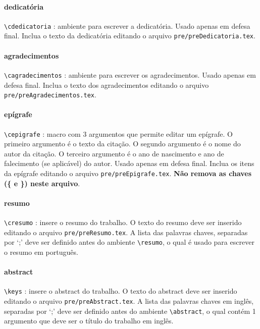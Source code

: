 %

\paragraph{dedicatória\\}
\verb|\cdedicatoria| : ambiente para escrever a dedicatória. Usado apenas em defesa final. Inclua o texto da dedicatória editando o arquivo \verb|pre/preDedicatoria.tex|.

\paragraph{agradecimentos\\}
\verb|\cagradecimentos| : ambiente para escrever os agradecimentos. Usado apenas em defesa final. Inclua o texto dos agradecimentos editando o arquivo \verb|pre/preAgradecimentos.tex|.

\paragraph{epígrafe\\}
\verb|\cepigrafe| : macro com 3 argumentos que permite editar um epígrafe. O primeiro argumento é o texto da citação. O segundo argumento é o nome do autor da citação. O terceiro argumento é o ano de nascimento e ano de falecimento (se aplicável) do autor. Usado apenas em defesa final. Inclua os itens da epígrafe editando o arquivo \verb|pre/preEpigrafe.tex|. \textbf{Não remova as chaves (\{ e \}) neste arquivo}.

\paragraph{resumo\\}
\verb|\cresumo| : insere o resumo do trabalho. O texto do resumo deve ser inserido editando o arquivo \verb|pre/preResumo.tex|. A lista das palavras chaves, separadas por `;' deve ser definido antes do ambiente \verb|\resumo|, o qual é usado para escrever o resumo em português.

\paragraph{abstract\\}
\verb|\keys| : insere o abstract do trabalho. O texto do abstract deve ser inserido editando o arquivo \verb|pre/preAbstract.tex|. A lista das palavras chaves em inglês, separadas por `;' deve ser definido antes do ambiente \verb|\abstract|, o qual contém 1 argumento que deve ser o título do trabalho em inglês.

